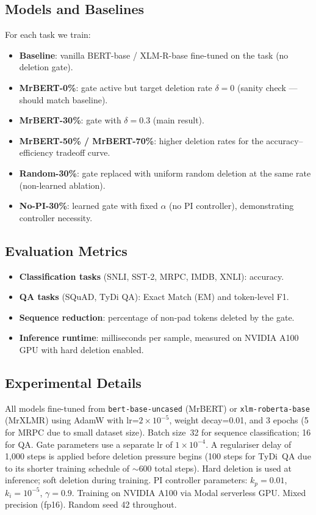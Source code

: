 \subsection{Models and Baselines}
\label{sec:models}

For each task we train:
\begin{itemize}[nosep]
    \item \textbf{Baseline}: vanilla BERT-base / XLM-R-base fine-tuned on the task (no deletion gate).
    \item \textbf{MrBERT-0\%}: gate active but target deletion rate $\delta = 0$ (sanity check --- should match baseline).
    \item \textbf{MrBERT-30\%}: gate with $\delta = 0.3$ (main result).
    \item \textbf{MrBERT-50\% / MrBERT-70\%}: higher deletion rates for the accuracy--efficiency tradeoff curve.
    \item \textbf{Random-30\%}: gate replaced with uniform random deletion at the same rate (non-learned ablation).
    \item \textbf{No-PI-30\%}: learned gate with fixed $\alpha$ (no PI controller), demonstrating controller necessity.
\end{itemize}


\subsection{Evaluation Metrics}
\label{sec:metrics}

\begin{itemize}[nosep]
    \item \textbf{Classification tasks} (SNLI, SST-2, MRPC, IMDB, XNLI): accuracy.
    \item \textbf{QA tasks} (SQuAD, TyDi QA): Exact Match (EM) and token-level F1.
    \item \textbf{Sequence reduction}: percentage of non-pad tokens deleted by the gate.
    \item \textbf{Inference runtime}: milliseconds per sample, measured on NVIDIA A100 GPU with hard deletion enabled.
\end{itemize}


\subsection{Experimental Details}
\label{sec:exp-details}

All models fine-tuned from \texttt{bert-base-uncased} (MrBERT) or \texttt{xlm-roberta-base} (MrXLMR) using AdamW with lr=$2 \times 10^{-5}$, weight decay=0.01, and 3 epochs (5 for MRPC due to small dataset size).
Batch size~32 for sequence classification; 16 for QA.
Gate parameters use a separate lr of $1 \times 10^{-4}$.
A regulariser delay of 1,000 steps is applied before deletion pressure begins (100 steps for TyDi~QA due to its shorter training schedule of $\sim$600 total steps).
Hard deletion is used at inference; soft deletion during training.
PI controller parameters: $k_p = 0.01$, $k_i = 10^{-5}$, $\gamma = 0.9$.
Training on NVIDIA A100 via Modal serverless GPU.
Mixed precision (fp16).
Random seed 42 throughout.



